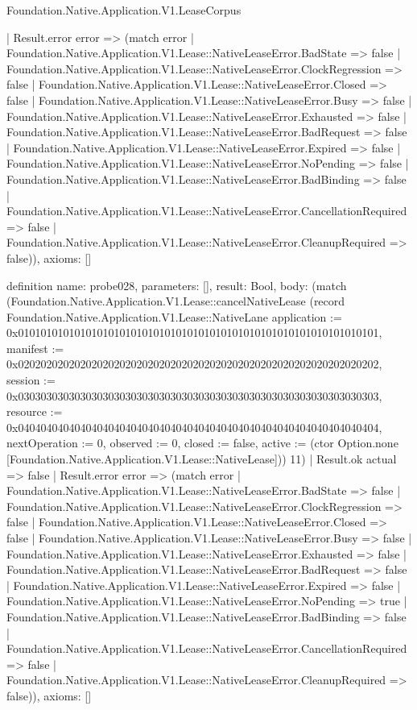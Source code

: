 \begin{lexlean}{Foundation.Native.Application.V1.LeaseCorpus}
\begin{semanticmodule}
{    | Result.error error => (match error
      | Foundation.Native.Application.V1.Lease::NativeLeaseError.BadState => false
      | Foundation.Native.Application.V1.Lease::NativeLeaseError.ClockRegression => false
      | Foundation.Native.Application.V1.Lease::NativeLeaseError.Closed => false
      | Foundation.Native.Application.V1.Lease::NativeLeaseError.Busy => false
      | Foundation.Native.Application.V1.Lease::NativeLeaseError.Exhausted => false
      | Foundation.Native.Application.V1.Lease::NativeLeaseError.BadRequest => false
      | Foundation.Native.Application.V1.Lease::NativeLeaseError.Expired => false
      | Foundation.Native.Application.V1.Lease::NativeLeaseError.NoPending => false
      | Foundation.Native.Application.V1.Lease::NativeLeaseError.BadBinding => false
      | Foundation.Native.Application.V1.Lease::NativeLeaseError.CancellationRequired => false
      | Foundation.Native.Application.V1.Lease::NativeLeaseError.CleanupRequired => false)),
  axioms: []
}

definition{
  name: probe028,
  parameters: [],
  result: Bool,
  body: (match (Foundation.Native.Application.V1.Lease::cancelNativeLease (record Foundation.Native.Application.V1.Lease::NativeLane {application := 0x0101010101010101010101010101010101010101010101010101010101010101, manifest := 0x0202020202020202020202020202020202020202020202020202020202020202, session := 0x0303030303030303030303030303030303030303030303030303030303030303, resource := 0x0404040404040404040404040404040404040404040404040404040404040404, nextOperation := 0, observed := 0, closed := false, active := (ctor Option.none [Foundation.Native.Application.V1.Lease::NativeLease])}) 11)
    | Result.ok actual => false
    | Result.error error => (match error
      | Foundation.Native.Application.V1.Lease::NativeLeaseError.BadState => false
      | Foundation.Native.Application.V1.Lease::NativeLeaseError.ClockRegression => false
      | Foundation.Native.Application.V1.Lease::NativeLeaseError.Closed => false
      | Foundation.Native.Application.V1.Lease::NativeLeaseError.Busy => false
      | Foundation.Native.Application.V1.Lease::NativeLeaseError.Exhausted => false
      | Foundation.Native.Application.V1.Lease::NativeLeaseError.BadRequest => false
      | Foundation.Native.Application.V1.Lease::NativeLeaseError.Expired => false
      | Foundation.Native.Application.V1.Lease::NativeLeaseError.NoPending => true
      | Foundation.Native.Application.V1.Lease::NativeLeaseError.BadBinding => false
      | Foundation.Native.Application.V1.Lease::NativeLeaseError.CancellationRequired => false
      | Foundation.Native.Application.V1.Lease::NativeLeaseError.CleanupRequired => false)),
  axioms: []
}


\end{semanticmodule}
\end{lexlean}

